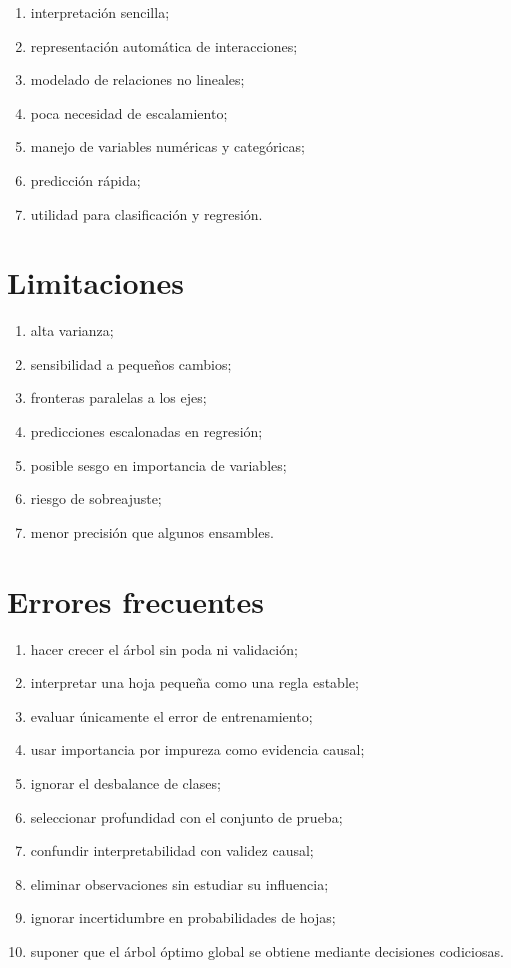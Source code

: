 \documentclass[
  spanish,
  11pt,
  letterpaper,
  DIV=11,
  numbers=noendperiod]{scrreprt}
\providecommand{\tightlist}{%
  \setlength{\itemsep}{0pt}\setlength{\parskip}{0pt}}
\theoremstyle{definition}
\theoremstyle{plain}
\theoremstyle{definition}
\theoremstyle{remark}
\begin{document}
\begin{enumerate}
\def\labelenumi{\arabic{enumi}.}
\tightlist
\item
  interpretación sencilla;
\item
  representación automática de interacciones;
\item
  modelado de relaciones no lineales;
\item
  poca necesidad de escalamiento;
\item
  manejo de variables numéricas y categóricas;
\item
  predicción rápida;
\item
  utilidad para clasificación y regresión.
\end{enumerate}

\section{Limitaciones}\label{limitaciones-1}

\begin{enumerate}
\def\labelenumi{\arabic{enumi}.}
\tightlist
\item
  alta varianza;
\item
  sensibilidad a pequeños cambios;
\item
  fronteras paralelas a los ejes;
\item
  predicciones escalonadas en regresión;
\item
  posible sesgo en importancia de variables;
\item
  riesgo de sobreajuste;
\item
  menor precisión que algunos ensambles.
\end{enumerate}

\section{Errores frecuentes}\label{errores-frecuentes-12}

\begin{enumerate}
\def\labelenumi{\arabic{enumi}.}
\tightlist
\item
  hacer crecer el árbol sin poda ni validación;
\item
  interpretar una hoja pequeña como una regla estable;
\item
  evaluar únicamente el error de entrenamiento;
\item
  usar importancia por impureza como evidencia causal;
\item
  ignorar el desbalance de clases;
\item
  seleccionar profundidad con el conjunto de prueba;
\item
  confundir interpretabilidad con validez causal;
\item
  eliminar observaciones sin estudiar su influencia;
\item
  ignorar incertidumbre en probabilidades de hojas;
\item
  suponer que el árbol óptimo global se obtiene mediante decisiones
  codiciosas.
\end{enumerate}
\end{document}
